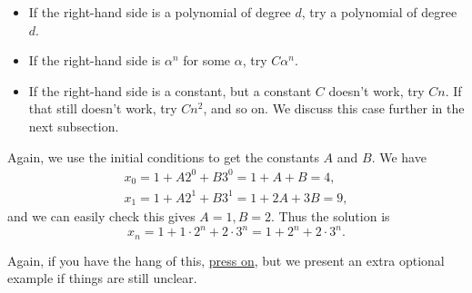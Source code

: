 \documentclass[
  a4paper,
]{article}
\providecommand{\tightlist}{%
  \setlength{\itemsep}{0pt}\setlength{\parskip}{0pt}}
\theoremstyle{definition}
\theoremstyle{definition}
\theoremstyle{definition}
\theoremstyle{remark}
\begin{document}
\begin{itemize}
\tightlist
\item
  If the right-hand side is a polynomial of degree \(d\), try a polynomial of degree \(d\).
\item
  If the right-hand side is \(\alpha^n\) for some \(\alpha\), try \(C\alpha^n\).
\item
  If the right-hand side is a constant, but a constant \(C\) doesn't work, try \(Cn\). If that still doesn't work, try \(Cn^2\), and so on. We discuss this case further in the next subsection.
\end{itemize}

Again, we use the initial conditions to get the constants \(A\) and \(B\). We have
\begin{gather*}
x_0 = 1 + A2^0 + B3^0 = 1+ A + B = 4 , \\
x_1 = 1 + A2^1 + B3^1 = 1+ 2A + 3B = 9 ,
\end{gather*}
and we can easily check this gives \(A = 1, B = 2\). Thus the solution is
\[ x_n = 1 + 1\cdot 2^n + 2 \cdot 3^n = 1 + 2^n + 2 \cdot 3^n . \]

Again, if you have the hang of this, \protect\hyperlink{duration-solve}{press on}, but we present an extra optional example if things are still unclear.
\end{document}
